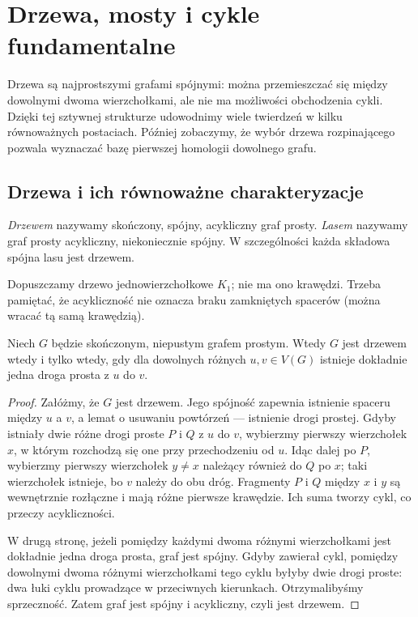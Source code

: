 \chapter{Drzewa, mosty i cykle fundamentalne}
\label{ch:tg-drzewa}

Drzewa są najprostszymi grafami spójnymi: można przemieszczać się
między dowolnymi dwoma wierzchołkami, ale nie ma możliwości
obchodzenia cykli. Dzięki tej sztywnej strukturze udowodnimy
wiele twierdzeń w kilku równoważnych postaciach. Później
zobaczymy, że wybór drzewa rozpinającego pozwala wyznaczać
bazę pierwszej homologii dowolnego grafu.

\section{Drzewa i ich równoważne charakteryzacje}
\label{sec:tg-def-drzewo}

\begin{definicja}
\emph{Drzewem} nazywamy skończony, spójny, acykliczny
graf prosty. \emph{Lasem} nazywamy graf prosty
acykliczny, niekoniecznie spójny. W szczególności
każda składowa spójna lasu jest drzewem.
\end{definicja}

Dopuszczamy drzewo jednowierzchołkowe $K_1$; nie ma
ono krawędzi. Trzeba pamiętać, że acykliczność
nie oznacza braku zamkniętych spacerów (można
wracać tą samą krawędzią).

\begin{twierdzenie}
Niech $G$ będzie skończonym, niepustym grafem prostym.
Wtedy $G$ jest drzewem wtedy i tylko wtedy, gdy
dla dowolnych różnych $u,v\in V(G)$ istnieje
dokładnie jedna droga prosta z $u$ do $v$.
\end{twierdzenie}

\begin{proof}
Załóżmy, że $G$ jest drzewem. Jego spójność zapewnia
istnienie spaceru między $u$ a $v$, a lemat o usuwaniu
powtórzeń --- istnienie drogi prostej. Gdyby istniały
dwie różne drogi proste $P$ i $Q$ z $u$ do $v$,
wybierzmy pierwszy wierzchołek $x$, w którym
rozchodzą się one przy przechodzeniu od $u$.
Idąc dalej po $P$, wybierzmy pierwszy wierzchołek
$y\ne x$ należący również do $Q$ po $x$;
taki wierzchołek istnieje, bo $v$ należy do obu
dróg. Fragmenty $P$ i $Q$ między $x$ i $y$
są wewnętrznie rozłączne i mają różne pierwsze
krawędzie. Ich suma tworzy cykl, co przeczy
acykliczności.

W drugą stronę, jeżeli pomiędzy każdymi dwoma
różnymi wierzchołkami jest dokładnie jedna droga
prosta, graf jest spójny. Gdyby zawierał cykl,
pomiędzy dowolnymi dwoma różnymi wierzchołkami
tego cyklu byłyby dwie drogi proste: dwa łuki
cyklu prowadzące w przeciwnych kierunkach.
Otrzymalibyśmy sprzeczność. Zatem graf jest
spójny i acykliczny, czyli jest drzewem.
\end{proof}

